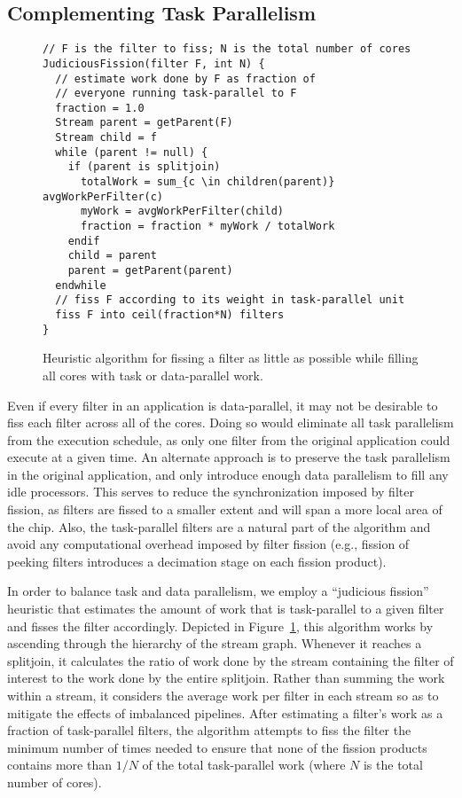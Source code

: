 \subsection{Complementing Task Parallelism}

\begin{figure}[t]
\small
\begin{verbatim}
// F is the filter to fiss; N is the total number of cores
JudiciousFission(filter F, int N) {
  // estimate work done by F as fraction of 
  // everyone running task-parallel to F
  fraction = 1.0
  Stream parent = getParent(F)
  Stream child = f
  while (parent != null) {
    if (parent is splitjoin)
      totalWork = sum_{c \in children(parent)} avgWorkPerFilter(c)
      myWork = avgWorkPerFilter(child)
      fraction = fraction * myWork / totalWork
    endif
    child = parent
    parent = getParent(parent)
  endwhile
  // fiss F according to its weight in task-parallel unit
  fiss F into ceil(fraction*N) filters
}
\end{verbatim}
\caption{Heuristic algorithm for fissing a filter as little as
possible while filling all cores with task or data-parallel
work.\label{fig:judicious-fission}}
\end{figure}

Even if every filter in an application is data-parallel, it may not be
desirable to fiss each filter across all of the cores.  Doing so would
eliminate all task parallelism from the execution schedule, as only
one filter from the original application could execute at a given
time.  An alternate approach is to preserve the task parallelism in
the original application, and only introduce enough data parallelism
to fill any idle processors.  This serves to reduce the
synchronization imposed by filter fission, as filters are fissed to a
smaller extent and will span a more local area of the chip.  Also, the
task-parallel filters are a natural part of the algorithm and avoid
any computational overhead imposed by filter fission (e.g., fission of
peeking filters introduces a decimation stage on each fission
product).

In order to balance task and data parallelism, we employ a ``judicious
fission'' heuristic that estimates the amount of work that is
task-parallel to a given filter and fisses the filter accordingly.
Depicted in Figure~\ref{fig:judicious-fission}, this algorithm works
by ascending through the hierarchy of the stream graph.  Whenever it
reaches a splitjoin, it calculates the ratio of work done by the
stream containing the filter of interest to the work done by the
entire splitjoin.  Rather than summing the work within a stream, it
considers the average work per filter in each stream so as to mitigate
the effects of imbalanced pipelines.  After estimating a filter's work as a fraction of
task-parallel filters, the algorithm attempts to fiss the filter the
minimum number of times needed to ensure that none of the fission
products contains more than $1/N$ of the total task-parallel work
(where $N$ is the total number of cores).

